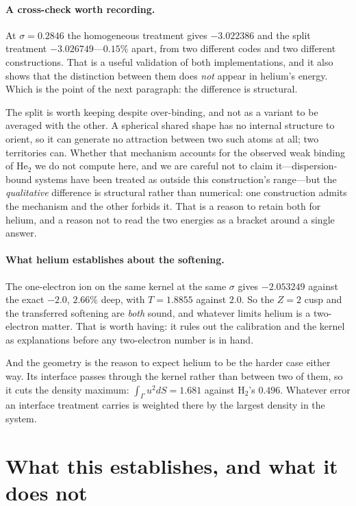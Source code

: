 \documentclass[11pt,a4paper]{article}
\begin{document}
\paragraph{A cross-check worth recording.} At $\sigma = 0.2846$ the homogeneous treatment gives
$-3.022386$ and the split treatment $-3.026749$---$0.15\%$ apart, from two different codes and two
different constructions. That is a useful validation of both implementations, and it also shows that
the distinction between them does \emph{not} appear in helium's energy. Which is the point of the
next paragraph: the difference is structural.

The split is worth keeping despite over-binding, and not as a variant to be averaged with the other.
A spherical shared shape has no internal structure to orient, so it can generate no attraction
between two such atoms at all; two territories can. Whether that mechanism accounts for the observed
weak binding of He$_2$ we do not compute here, and we are careful not to claim it---dispersion-bound
systems have been treated as outside this construction's range---but the \emph{qualitative}
difference is structural rather than numerical: one construction admits the mechanism and the other
forbids it. That is a reason to retain both for helium, and a reason not to read the two energies as
a bracket around a single answer.

\paragraph{What helium establishes about the softening.} The one-electron ion on the
same kernel at the same $\sigma$ gives $-2.053249$ against the exact $-2.0$, $2.66\%$ deep, with
$T = 1.8855$ against $2.0$. So the $Z = 2$ cusp and the transferred softening are \emph{both}
sound, and whatever limits helium is a two-electron matter. That is worth having: it rules out the
calibration and the kernel as explanations before any two-electron number is in hand.

And the geometry is the reason to expect helium to be the harder case either way. Its interface
passes through the kernel rather than between two of them, so it cuts the density maximum:
$\int_\Gamma u^2 dS = 1.681$ against H$_2$'s $0.496$. Whatever error an interface treatment
carries is weighted there by the largest density in the system.


\section{What this establishes, and what it does not}
\end{document}
